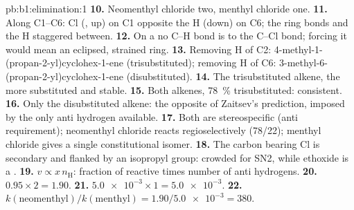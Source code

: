 \begin{solution}{pb:b1:elimination:1}
\textbf{10.} Neomenthyl chloride two, menthyl chloride one.
\textbf{11.} Along C1--C6: Cl (, up) on C1 opposite the  H (down)
on C6; the ring bonds and the  H staggered between.
\textbf{12.} On a  no C--H bond is  to the C--Cl bond;
forcing it would mean an eclipsed, strained ring.
\textbf{13.} Removing H of C2: 4-methyl-1-(propan-2-yl)cyclohex-1-ene
(trisubstituted); removing H of C6: 3-methyl-6-(propan-2-yl)cyclohex-1-ene
(disubstituted).
\textbf{14.} The trisubstituted alkene, the more substituted and stable.
\textbf{15.} Both alkenes, \qty{78}{\percent} trisubstituted: consistent.
\textbf{16.} Only the disubstituted alkene: the opposite of Zaitsev's
prediction, imposed by the only anti hydrogen available.
\textbf{17.} Both are stereospecific (anti requirement); neomenthyl chloride
reacts regioselectively (78/22); menthyl chloride gives a single
constitutional isomer.
\textbf{18.} The carbon bearing Cl is secondary and flanked by an isopropyl
group: crowded for SN2, while ethoxide is a .
\textbf{19.} $v \propto x\,n_{\mathrm{H}}$: fraction of reactive  times
number of anti hydrogens.
\textbf{20.} $0.95 \times 2 = 1.90$.
\textbf{21.} $\num{5.0e-3} \times 1 = \num{5.0e-3}$.
\textbf{22.} \textbf{$k(\text{neomenthyl})/k(\text{menthyl}) = 1.90/\num{5.0e-3}
= 380$}.
\end{solution}
